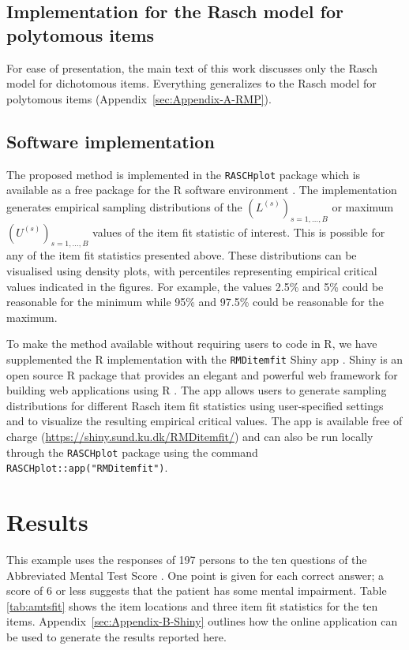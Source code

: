 \documentclass[11pt,a4paper]{article}
\begin{document}
\subsection{Implementation for the Rasch model for polytomous items}

For ease of presentation, the main text of this work discusses only the Rasch model for dichotomous items. Everything generalizes to the Rasch model for polytomous items (Appendix~\ref{sec:Appendix-A-RMP}).

\subsection{Software implementation}

The proposed method is implemented in the \texttt{RASCHplot} package which is available as a free package for the R software environment \cite{RCoreTeam-2022}. 
The implementation generates empirical sampling distributions of the $(L^{(s)})_{s=1,\ldots,B}$ or maximum $(U^{(s)})_{s=1,\ldots,B}$ values of the item fit statistic of interest. This is possible for any of the item fit statistics presented above. These distributions can be visualised using density plots, with percentiles representing empirical critical values indicated in the figures. For example, the values 2.5\% and 5\% could be reasonable for the minimum while 95\% and 97.5\% could be reasonable for the maximum. 

To make the method available without requiring users to code in R, we have supplemented the R implementation with the \texttt{RMDitemfit} Shiny app \cite{Chang-Cheng-Allaire-et-al-2022}. Shiny is an open source R package that provides an elegant and powerful web framework for building web applications using R \cite{Beeley-2013}. The app allows users to generate sampling distributions for different Rasch item fit statistics using user-specified settings and to visualize the resulting empirical critical values. The app is available free of charge (\url{https://shiny.sund.ku.dk/RMDitemfit/}) and can also be run locally through the \texttt{RASCHplot} package using the command \texttt{RASCHplot::app("RMDitemfit")}.

\section{Results}

This example uses the responses of 197 persons to the ten questions of the Abbreviated Mental Test Score \cite[AMTS]{Hodkinson-1972}. One point is given for each correct answer; a score of 6 or less suggests that the patient has some mental impairment. Table \ref{tab:amtsfit} shows the item locations and three item fit statistics for the ten items. Appendix~\ref{sec:Appendix-B-Shiny} outlines how the online application can be used to generate the results reported here.
\end{document}
